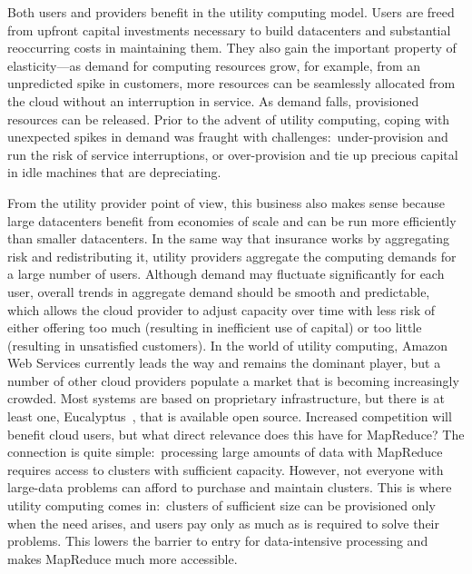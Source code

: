 Both users and providers benefit in the utility computing model.
Users are freed from upfront capital investments necessary to build
datacenters and substantial reoccurring costs in maintaining them.
They also gain the important property of elasticity---as demand for
computing resources grow, for example, from an unpredicted spike in
customers, more resources can be seamlessly allocated from the cloud
without an interruption in service.  As demand falls, provisioned
resources can be released.  Prior to the advent of utility computing,
coping with unexpected spikes in demand was fraught with
challenges:\ under-provision and run the risk of service
interruptions, or over-provision and tie up precious capital in idle
machines that are depreciating.

From the utility provider point of view, this business also makes
sense because large datacenters benefit from economies of scale and
can be run more efficiently than smaller datacenters.  In the same way
that insurance works by aggregating risk and redistributing it,
utility providers aggregate the computing demands for a large number
of users.  Although demand may fluctuate significantly for each user,
overall trends in aggregate demand should be smooth and predictable,
which allows the cloud provider to adjust capacity over time with less
risk of either offering too much (resulting in inefficient use of
capital) or too little (resulting in unsatisfied customers).  In the
world of utility computing, Amazon Web Services currently leads the
way and remains the dominant player, but a number of other cloud
providers populate a market that is becoming increasingly crowded.
Most systems are based on proprietary infrastructure, but there is at
least one, Eucalyptus~\cite{Nurmi_etal_2009}, that is available open
source.  Increased competition will benefit cloud users, but what
direct relevance does this have for MapReduce?  The connection is
quite simple:\ processing large amounts of data with MapReduce
requires access to clusters with sufficient capacity.  However, not
everyone with large-data problems can afford to purchase and maintain
clusters.  This is where utility computing comes in:\ clusters of
sufficient size can be provisioned only when the need arises, and
users pay only as much as is required to solve their problems.  This
lowers the barrier to entry for data-intensive processing and makes
MapReduce much more accessible.

